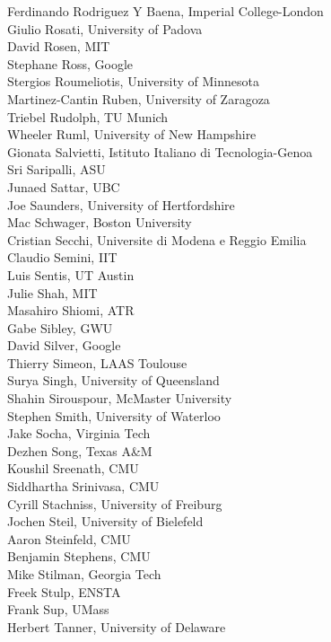 \begin{multicols}{3}
{Ferdinando Rodriguez Y Baena, Imperial College-London\\
Giulio Rosati, University of Padova\\
David Rosen, MIT\\
Stephane Ross, Google\\
Stergios Roumeliotis, University of Minnesota\\
Martinez-Cantin Ruben, University of Zaragoza\\
Triebel Rudolph, TU Munich\\
Wheeler Ruml, University of New Hampshire\\
Gionata Salvietti, Istituto Italiano di Tecnologia-Genoa\\
Sri Saripalli, ASU\\
Junaed Sattar, UBC\\
Joe Saunders, University of Hertfordshire\\
Mac Schwager, Boston University\\
Cristian Secchi, Universite di Modena e Reggio Emilia\\
Claudio Semini, IIT\\
Luis Sentis, UT Austin\\
Julie Shah, MIT\\
Masahiro Shiomi, ATR\\
Gabe Sibley, GWU\\
David Silver, Google\\
Thierry Simeon, LAAS Toulouse\\
Surya Singh, University of Queensland\\
Shahin Sirouspour, McMaster University\\
Stephen Smith, University of Waterloo\\
Jake Socha, Virginia Tech\\
Dezhen Song, Texas A\&M\\
Koushil Sreenath, CMU\\
Siddhartha Srinivasa, CMU\\
Cyrill Stachniss, University of Freiburg\\
Jochen Steil, University of Bielefeld\\
Aaron Steinfeld, CMU\\
Benjamin Stephens, CMU\\
Mike Stilman, Georgia Tech\\
Freek Stulp, ENSTA\\
Frank Sup, UMass\\
Herbert Tanner, University of Delaware\\
}
\end{multicols}
